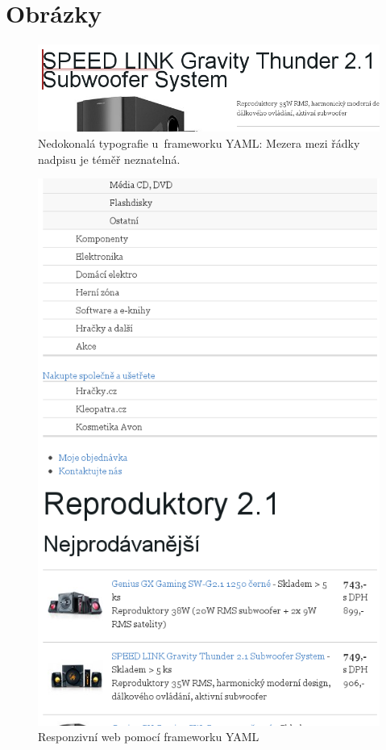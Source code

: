\documentclass[thesis=B,czech]{FITthesis}[2012/06/26]
\begin{document}
\appendix
\chapter{Obrázky}

\begin{figure}[h]
	\begin{center}
	\includegraphics[scale=0.7]{images/image04.png}
	\end{center}
	\caption[Nedokonalá typografie u~frameworku YAML]{Nedokonalá typografie u~frameworku YAML: Mezera mezi řádky nadpisu je téměř neznatelná.}
	\label{imgTyp}
\end{figure}

\begin{figure}[h]
	\begin{center}
	\includegraphics[scale=0.7]{images/image16.png}
	\end{center}
	\caption{Responzivní web pomocí frameworku YAML}
	\label{imgYR}
\end{figure}
\end{document}
